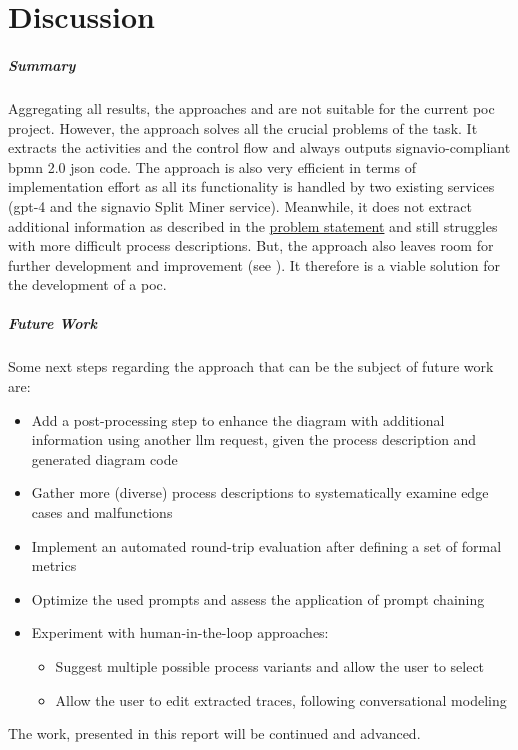 \chapter{Discussion}
\paragraph{Summary}
Aggregating all results, the approaches  and  are not suitable for the current \acs{poc} project. However, the  approach solves all the crucial problems of the task. It extracts the activities and the control flow and always outputs \gls{signavio}-compliant \acs{bpmn} 2.0 \acs{json} code. The approach is also very efficient in terms of implementation effort as all its functionality is handled by two existing services (\acs{gpt}-4 and the \gls{signavio} Split Miner service). Meanwhile, it does not extract additional information as described in the \hyperref[par:add-info]{problem statement} and still struggles with more difficult process descriptions. But, the approach also leaves room for further development and improvement (see ). It therefore is a viable solution for the development of a \acs{poc}.


\paragraph{Future Work}\label{par:next-steps}
Some next steps regarding the  approach that can be the subject of future work are:

\begin{itemize}
    \item Add a post-processing step to enhance the diagram with additional information using another \gls{llm} request, given the process description and generated diagram code
    \item Gather more (diverse) process descriptions to systematically examine edge cases and malfunctions
    \item Implement an automated round-trip evaluation after defining a set of formal metrics
    \item Optimize the used prompts and assess the application of prompt chaining
    \item Experiment with human-in-the-loop approaches:
          \begin{itemize}
              \item Suggest multiple possible process variants and allow the user to select
              \item Allow the user to edit extracted \glspl{trace}, following conversational modeling \cite{conversational-process-modelling}
          \end{itemize}
\end{itemize}

The work, presented in this report will be continued and advanced.

